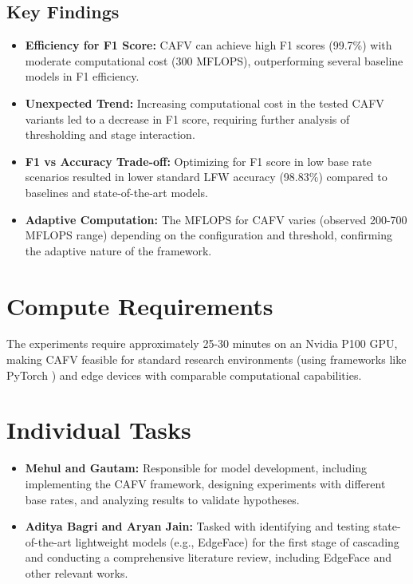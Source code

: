 \documentclass[times,10pt,twocolumn]{article}
\begin{document}
\subsection{Key Findings}
\begin{itemize}
    \item \textbf{Efficiency for F1 Score:} CAFV can achieve high F1 scores (99.7\%) with moderate computational cost (300 MFLOPS), outperforming several baseline models in F1 efficiency.
    \item \textbf{Unexpected Trend:} Increasing computational cost in the tested CAFV variants led to a decrease in F1 score, requiring further analysis of thresholding and stage interaction.
    \item \textbf{F1 vs Accuracy Trade-off:} Optimizing for F1 score in low base rate scenarios resulted in lower standard LFW accuracy (98.83\%) compared to baselines and state-of-the-art models.
    \item \textbf{Adaptive Computation:} The MFLOPS for CAFV varies (observed 200-700 MFLOPS range) depending on the configuration and threshold, confirming the adaptive nature of the framework.
\end{itemize}

\section{Compute Requirements}
The experiments require approximately 25-30 minutes on an Nvidia P100 GPU, making CAFV feasible for standard research environments (using frameworks like PyTorch \cite{pytorch}) and edge devices with comparable computational capabilities.

\section{Individual Tasks}
\begin{itemize}
    \item \textbf{Mehul and Gautam:} Responsible for model development, including implementing the CAFV framework, designing experiments with different base rates, and analyzing results to validate hypotheses.
    \item \textbf{Aditya Bagri and Aryan Jain:} Tasked with identifying and testing state-of-the-art lightweight models (e.g., EdgeFace) for the first stage of cascading and conducting a comprehensive literature review, including EdgeFace \cite{edgeface2023} and other relevant works.
\end{itemize}


{\small


}
\end{document}
